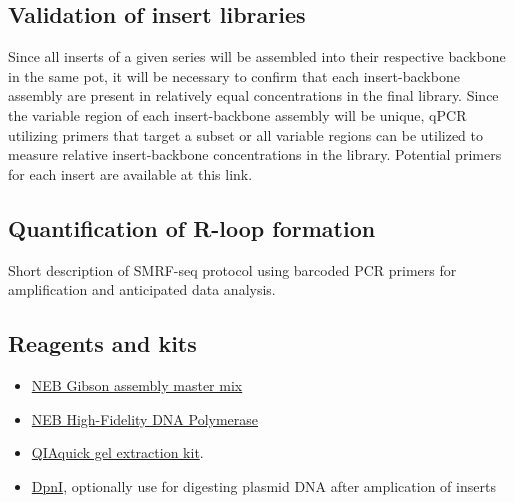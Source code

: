 \documentclass[11pt]{article}
\begin{document}
\subsection{Validation of insert libraries}

Since all inserts of a given series will be assembled into their respective backbone in the same pot, it will be necessary to confirm that each insert-backbone assembly are present in relatively equal concentrations in the final library. Since the variable region of each insert-backbone assembly will be unique, qPCR utilizing primers that target a subset or all variable regions can be utilized to measure relative insert-backbone concentrations in the library. Potential primers for each insert are available at this link. 

\subsection{Quantification of R-loop formation }

Short description of SMRF-seq protocol using barcoded PCR primers for amplification 
and anticipated data analysis. 

\subsection{Reagents and kits}

\begin{itemize}
	\item \href{https://www.neb.com/products/e2611-gibson-assembly-master-mix#Product\%20Information_Properties\%20\&\%20Usage}{NEB Gibson assembly master mix}
	\item \href{https://www.neb.com/products/m0491-q5-high-fidelity-dna-polymerase#Product\%20Information}{NEB High-Fidelity DNA Polymerase}
	\item \href{https://www.qiagen.com/us/products/discovery-translational-research/dna-rna-purification/dna-purification/dna-clean-up/qiaquick-gel-extraction-kit/#orderinginformation/}{QIAquick gel extraction kit}. 
	\item \href{https://www.neb.com/products/r0176-dpni?__cf_chl_jschl_tk__=d22d8cb49b9b2d4ff2532de61875fea36af4066f-1626291600-0-ARBMmni5PdhcCrqckk9zN05YGR50cB-otICbDTrUStRYlPQzdrbyJvjEOoI2QusMU-HOcKBcontIQfQRYoQqN9R2hNCL0XzFa2hP3-_c6Vf1sL2Sb2Bs_DXW38t8Oc1NxSg0caQ4FlAGqVNswAJaml9BhLC5dWj1sCuqKwDj72JKO8eI9d3mlCcNVIAVs8n1xFpuo1_oyafffkTnQ-ysv358pg1RrIbChfkwqXctDQennQm_CRjVjuitrXFFNjgAqBDJBKFRMZKkoOYlTDEDBsuaQaQtMxNwL5u7yIJ5mNCrkkuiikIGg7Was3tNj1d7D-7bnJrfXr8jIfG3qW6kvIkrZBJey0JQAVMQGVc4Ps0t0_iS3P4ahcZRytZezR6Fq9lrMqGJkB_Xmxyr0cVoXrbIv136yLISC-RPNR4MDWXe#Product\%20Information}{DpnI}, optionally use for digesting plasmid DNA after amplication of inserts
\end{itemize}
\end{document}
